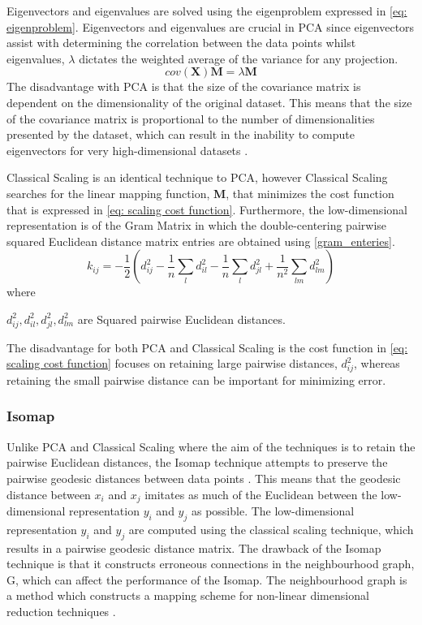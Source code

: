 \documentclass[11pt]{article}
\begin{document}
	Eigenvectors and eigenvalues are solved using the eigenproblem expressed in \eqref{eq: eigenproblem}. Eigenvectors and eigenvalues are crucial in PCA since eigenvectors assist with determining the correlation between the data points whilst eigenvalues, $\lambda$ dictates the weighted average of the variance for any projection.
	\begin{equation}
	cov(\textbf{X})\textbf{M} = \lambda\textbf{M}
	\label{eq: eigenproblem}
	\end{equation}
	The disadvantage with PCA is that the size of the covariance matrix is dependent on the dimensionality of the original dataset. This means that the size of the covariance matrix is proportional to the number of dimensionalities presented by the dataset, which can result in the inability to compute eigenvectors for very high-dimensional datasets \cite{van2009dimensionality}.
	
	Classical Scaling is an identical technique to PCA, however Classical Scaling searches for the linear mapping  function, \textbf{M}, that minimizes the cost function that is expressed in \eqref{eq: scaling cost function}. Furthermore, the low-dimensional representation is of the Gram Matrix in which the double-centering pairwise squared Euclidean distance matrix entries are obtained using \eqref{gram_enteries}.
	\begin{equation}
	k_{ij} = -\frac{1}{2}(d_{ij}^{2}-\frac{1}{n}\sum_{l}d_{il}^{2} - \frac{1}{n}\sum_{l}d_{jl}^{2} + \frac{1}{n^2}\sum_{lm}d_{lm}^{2})
	\label{gram_enteries}
	\end{equation}
	where 

	$d_{ij}^2, d_{il}^2, d_{jl}^2, d_{lm}^2$ are Squared pairwise Euclidean distances.
	
	The disadvantage for both PCA and Classical Scaling is the cost function in \eqref{eq: scaling cost function} focuses on retaining large pairwise distances, $d_{ij}^2$, whereas retaining the small pairwise distance can be important for minimizing error.
	
	\subsubsection{Isomap}
	Unlike PCA and Classical Scaling where the aim of the techniques is to retain the pairwise Euclidean distances, the Isomap technique attempts to preserve the pairwise geodesic distances between data points \cite{Zhang2012}. This means that the geodesic distance between $x_i$ and $x_j$ imitates as much of the Euclidean between the low-dimensional representation $y_i$ and $y_j$ as possible. The low-dimensional representation $y_i$ and $y_j$ are computed using the classical scaling technique, which results in a pairwise geodesic distance matrix. The drawback of the Isomap technique is that it constructs erroneous connections in the neighbourhood graph, G, which can affect the performance of the Isomap. The neighbourhood graph is a method which constructs a mapping scheme for non-linear dimensional reduction techniques \cite{Aeini2014}.
	
\end{document}
